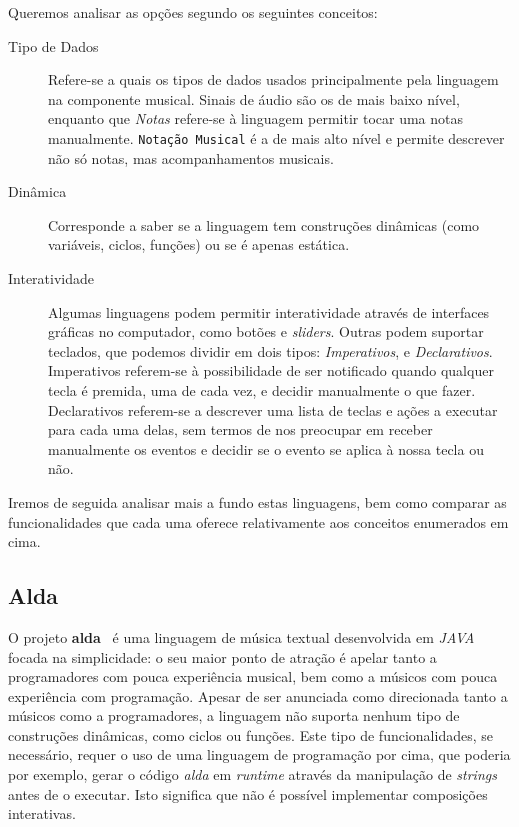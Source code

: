Queremos analisar as opções segundo os seguintes conceitos:
\begin{description}
 \item[Tipo de Dados] Refere-se a quais os tipos de dados usados principalmente pela linguagem na componente musical. Sinais de áudio são os de mais baixo nível, enquanto que \textit{Notas} refere-se à linguagem permitir tocar uma notas manualmente. \texttt{Notação Musical} é a de mais alto nível e permite descrever não só notas, mas acompanhamentos musicais.
 \item[Dinâmica] Corresponde a saber se a linguagem tem construções dinâmicas (como variáveis, ciclos, funções) ou se é apenas estática.
 \item[Interatividade] Algumas linguagens podem permitir interatividade através de interfaces gráficas no computador, como botões e \textit{sliders}. Outras podem suportar teclados, que podemos dividir em dois tipos: \textit{Imperativos}, e \textit{Declarativos}. Imperativos referem-se à possibilidade de ser notificado quando qualquer tecla é premida, uma de cada vez, e decidir manualmente o que fazer. Declarativos referem-se a descrever uma lista de teclas e ações a executar para cada uma delas, sem termos de nos preocupar em receber manualmente os eventos e decidir se o evento se aplica à nossa tecla ou não.
\end{description}


Iremos de seguida analisar mais a fundo estas linguagens, bem como comparar as funcionalidades que cada uma oferece relativamente aos conceitos enumerados em cima.
\subsection{Alda}
O projeto \textbf{alda}~\citep{alda} é uma linguagem de música textual desenvolvida em \textit{JAVA} focada na simplicidade: o seu maior ponto de atração é apelar tanto a programadores com pouca experiência musical, bem como a músicos com pouca experiência com programação.
Apesar de ser anunciada como direcionada tanto a músicos como a programadores, a linguagem não suporta nenhum tipo de construções dinâmicas, como ciclos ou funções. Este tipo de funcionalidades, se necessário, requer o uso de uma linguagem de programação por cima, que poderia por exemplo, gerar o código \textit{alda} em \textit{runtime} através da manipulação de \textit{strings} antes de o executar. Isto significa que não é possível implementar composições interativas.

